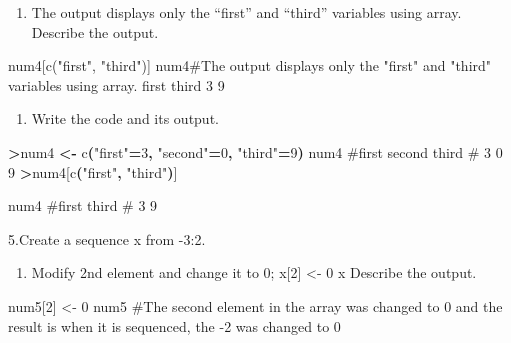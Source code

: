 \documentclass[
]{article}
\newenvironment{Shaded}{\begin{snugshade}}{\end{snugshade}}
\newcommand{\DecValTok}[1]{\textcolor[rgb]{0.00,0.00,0.81}{#1}}
\newcommand{\NormalTok}[1]{#1}
\newcommand{\OperatorTok}[1]{\textcolor[rgb]{0.81,0.36,0.00}{\textbf{#1}}}
\newcommand{\StringTok}[1]{\textcolor[rgb]{0.31,0.60,0.02}{#1}}
\providecommand{\tightlist}{%
  \setlength{\itemsep}{0pt}\setlength{\parskip}{0pt}}
\begin{document}
\begin{enumerate}
\def\labelenumi{\alph{enumi}.}
\tightlist
\item
  The output displays only the ``first'' and ``third'' variables using
  array. Describe the output.
\end{enumerate}

\begin{Shaded}
\begin{Highlighting}[]
\NormalTok{num4[c("first", "third")] }
\NormalTok{num4\#The output displays only the "first" and "third" variables using array.}
\NormalTok{first third }
\NormalTok{    3     9}
\end{Highlighting}
\end{Shaded}

\begin{enumerate}
\def\labelenumi{\alph{enumi}.}
\setcounter{enumi}{1}
\tightlist
\item
  Write the code and its output.
\end{enumerate}

\begin{Shaded}
\begin{Highlighting}[]
\OperatorTok{\textgreater{}}\NormalTok{num4 }\OperatorTok{\textless{}{-}}\NormalTok{ c}\OperatorTok{(}\StringTok{"first"}\OperatorTok{=}\DecValTok{3}\OperatorTok{,} \StringTok{"second"}\OperatorTok{=}\DecValTok{0}\OperatorTok{,} \StringTok{"third"}\OperatorTok{=}\DecValTok{9}\OperatorTok{)}
\NormalTok{num4 \#first second  third }
\NormalTok{     \#  }\DecValTok{3}      \DecValTok{0}      \DecValTok{9} 
\OperatorTok{\textgreater{}}\NormalTok{num4[c}\OperatorTok{(}\StringTok{"first"}\OperatorTok{,} \StringTok{"third"}\OperatorTok{)}\NormalTok{]}

\NormalTok{num4 \#first third }
\NormalTok{     \#    }\DecValTok{3}     \DecValTok{9}
\end{Highlighting}
\end{Shaded}

5.Create a sequence x from -3:2.

\begin{enumerate}
\def\labelenumi{\alph{enumi}.}
\tightlist
\item
  Modify 2nd element and change it to 0; x{[}2{]} \textless- 0 x
  Describe the output.
\end{enumerate}

\begin{Shaded}
\begin{Highlighting}[]
\NormalTok{num5[2] \textless{}{-} 0}
\NormalTok{num5  \#The second element in the array was changed to 0 and the result is when it is sequenced, the {-}2 }
\NormalTok{      was changed to 0}
\end{Highlighting}
\end{Shaded}
\end{document}
